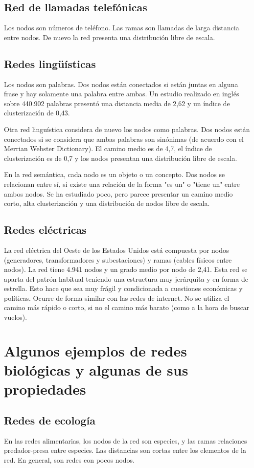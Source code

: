 \subsection{Red de llamadas telefónicas}
Los nodos son números de teléfono. Las ramas son llamadas de larga distancia entre nodos. De nuevo la red presenta una distribución libre de escala.

\subsection{Redes lingüísticas}
Los nodos son palabras. Dos nodos están conectados si están juntas en alguna frase y hay solamente una palabra entre ambas. Un estudio realizado en inglés sobre 440.902 palabras presentó una distancia media de 2,62 y un índice de clusterización de 0,43.

Otra red linguística considera de nuevo los nodos como palabras. Dos nodos están conectados si se considera que ambas palabras son sinónimas (de acuerdo con el Merrian Webster Dictionary). El camino medio es de 4,7, el índice de clusterización es de 0,7 y los nodos presentan una distribución libre de escala.

En la red semántica, cada nodo es un objeto o un concepto. Dos nodos se relacionan entre sí, si existe una relación de la forma "es un" o "tiene un" entre ambos nodos. Se ha estudiado poco, pero parece presentar un camino medio corto, alta clusterización y una distribución de nodos libre de escala.

\subsection{Redes eléctricas}
La red eléctrica del Oeste de los Estados Unidos está compuesta por nodos (generadores, transformadores y subestaciones) y ramas (cables físicos entre nodos). La red tiene 4.941 nodos y un grado medio por nodo de 2,41. Esta red se aparta del patrón habitual teniendo una estructura muy jerárquita y en forma de estrella. Esto hace que sea muy frágil y condicionada a cuestiones económicas y políticas. Ocurre de forma similar con las redes de internet. No se utiliza el camino más rápido o corto, si no el camino más barato (como a la hora de buscar vuelos).

\section{Algunos ejemplos de redes biológicas y algunas de sus propiedades}
\subsection{Redes de ecología}
En las redes alimentarias, los nodos de la red son especies, y las ramas relaciones predador-presa entre especies. Las distancias son cortas entre los elementos de la red. En general, son redes con pocos nodos. 

